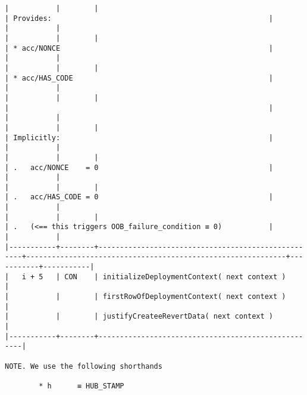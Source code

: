 \documentclass[varwidth=\maxdimen,margin=0.5cm,multi={verbatim}]{standalone}
\begin{document}
\begin{verbatim}
|           |        |                                                    | Provides:                                                   |           |           |
|           |        |                                                    | * acc/NONCE                                                 |           |           |
|           |        |                                                    | * acc/HAS_CODE                                              |           |           |
|           |        |                                                    |                                                             |           |           |
|           |        |                                                    | Implicitly:                                                 |           |           |
|           |        |                                                    | .   acc/NONCE    = 0                                        |           |           |
|           |        |                                                    | .   acc/HAS_CODE = 0                                        |           |           |
|           |        |                                                    | .   (<== this triggers OOB_failure_condition ≡ 0)           |           |           |
|-----------+--------+----------------------------------------------------+-------------------------------------------------------------+-----------+-----------|
|   i + 5   | CON    | initializeDeploymentContext( next context )        |
|           |        | firstRowOfDeploymentContext( next context )        |
|           |        | justifyCreateeRevertData( next context )           |
|-----------+--------+----------------------------------------------------|

NOTE. We use the following shorthands

        * h      ≡ HUB_STAMP

\end{verbatim}
\end{document}
